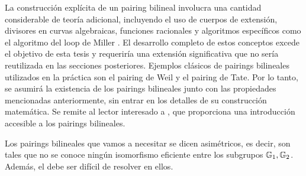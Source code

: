 La construcción explícita de un pairing bilineal involucra una cantidad considerable de teoría adicional, incluyendo el uso de cuerpos de extensión, divisores en curvas algebraicas, funciones racionales y algoritmos específicos como el algoritmo del loop de Miller \cite{miller86}. El desarrollo completo de estos conceptos excede el objetivo de esta tesis y requeriría una extensión significativa que no sería reutilizada en las secciones posteriores. Ejemplos clásicos de pairings bilineales utilizados en la práctica son el pairing de Weil y el pairing de Tate. Por lo tanto, se asumirá la existencia de los pairings bilineales junto con las propiedades mencionadas anteriormente, sin entrar en los detalles de su construcción matemática. Se remite al lector interesado a \cite{costello2010pairings}, que proporciona una introducción accesible a los pairings bilineales.

Los pairings bilineales que vamos a necesitar se dicen asimétricos, es decir, son tales que no se conoce ningún isomorfismo eficiente entre los subgrupos $\mathbb{G}_1,\mathbb{G}_2$. Además, el \ECDLP debe ser difícil de resolver en ellos.
